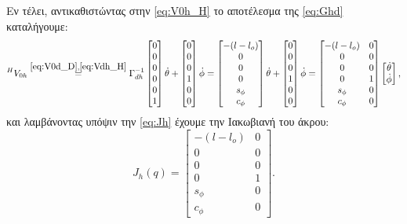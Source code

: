 \documentclass[12pt]{article} %
\numberwithin{equation}{section}  %
\begin{document}
Εν τέλει, αντικαθιστώντας στην \eqref{eq:V0h_H} το αποτέλεσμα της \eqref{eq:Ghd} καταλήγουμε:
\begin{equation}\label{eq:V0h_H_complete}
    ^{H}V_{0h} \overset{\eqref{eq:V0d_D}, \eqref{eq:Vdh_H}}{=} \Gamma^{-1}_{dh}
    \begin{bmatrix} 0 \\ 0 \\ 0 \\ 0 \\ 0 \\ 1 \end{bmatrix} \dot\theta + 
    \begin{bmatrix} 0 \\ 0 \\ 0 \\ 1 \\ 0 \\ 0 \end{bmatrix} \dot\phi = 
    \begin{bmatrix} -(l-l_o) \\ 0 \\ 0 \\ 0 \\ s_{\phi} \\ c_{\phi} \end{bmatrix} \dot\theta + 
    \begin{bmatrix} 0 \\ 0 \\ 0 \\ 1 \\ 0 \\ 0 \end{bmatrix} \dot\phi = 
    \begin{bmatrix}
        -(l-l_o) & 0 \\ 0 & 0 \\ 0 & 0 \\ 0 & 1 \\ s_{\phi} & 0 \\ c_{\phi} & 0
    \end{bmatrix} 
    \begin{bmatrix}
        \dot\theta \\ \dot\phi
    \end{bmatrix},
\end{equation}
και λαμβάνοντας υπόψιν την \eqref{eq:Jh} έχουμε την Ιακωβιανή του άκρου:
\begin{equation}\label{eq:Jh_matrix}
    J_h(q) = \begin{bmatrix}
        -(l-l_o) & 0 \\ 0 & 0 \\ 0 & 0 \\ 0 & 1 \\ s_{\phi} & 0 \\ c_{\phi} & 0
    \end{bmatrix} .
\end{equation}
\end{document}
